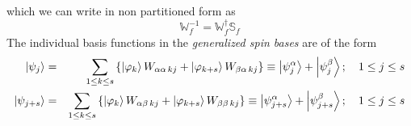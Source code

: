 \documentclass{article}
\begin{document}
which we can write in non partitioned form as 
\begin{equation}
\mathbb{W}_{f}^{-1}=\mathbb{W}_{f}^{\dagger }\mathbb{S}_{f}
\end{equation}%
The individual basis functions in the \emph{generalized spin bases }are of
the form 
\begin{eqnarray}
\left| \psi _{j}\right\rangle &=&\sum_{1\leq k\leq s}\left\{ \left| \varphi
_{k}\right\rangle W_{\alpha \alpha \,kj}+\left| \varphi _{k+s}\right\rangle
W_{\beta \alpha \,kj}\right\} \equiv \left| \psi _{j}^{\alpha }\right\rangle
+\left| \psi _{j}^{\beta }\right\rangle ;\quad 1\leq j\leq s  \notag \\
\left| \psi _{j+s}\right\rangle &=&\sum_{1\leq k\leq s}\left\{ \left|
\varphi _{k}\right\rangle W_{\alpha \beta \,kj}+\left| \varphi
_{k+s}\right\rangle W_{\beta \beta \,kj}\right\} \equiv \left| \psi
_{j+s}^{\alpha }\right\rangle +\left| \psi _{j+s}^{\beta }\right\rangle
;\quad 1\leq j\leq s
\end{eqnarray}
\end{document}

